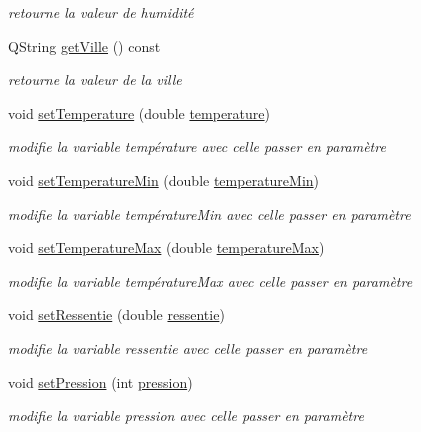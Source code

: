\begin{DoxyCompactItemize}
\begin{DoxyCompactList}\small\item\em retourne la valeur de humidité \end{DoxyCompactList}\item 
Q\+String \hyperlink{class_meteo_af9ceb3e99e123e6931f8cd9cfde57834}{get\+Ville} () const 
\begin{DoxyCompactList}\small\item\em retourne la valeur de la ville \end{DoxyCompactList}\item 
void \hyperlink{class_meteo_a7e15015233ae155d482e414804c4b381}{set\+Temperature} (double \hyperlink{class_meteo_a8086970687d7df655f68775bc0852178}{temperature})
\begin{DoxyCompactList}\small\item\em modifie la variable température avec celle passer en paramètre \end{DoxyCompactList}\item 
void \hyperlink{class_meteo_a7055da66033ec24def1e9f9688b837d1}{set\+Temperature\+Min} (double \hyperlink{class_meteo_a640f1543a82502057c333eed2c2b049e}{temperature\+Min})
\begin{DoxyCompactList}\small\item\em modifie la variable température\+Min avec celle passer en paramètre \end{DoxyCompactList}\item 
void \hyperlink{class_meteo_a1737d7a11c9bf4326071531acfcc3243}{set\+Temperature\+Max} (double \hyperlink{class_meteo_a5dd5312470d767714779344a524fd27b}{temperature\+Max})
\begin{DoxyCompactList}\small\item\em modifie la variable température\+Max avec celle passer en paramètre \end{DoxyCompactList}\item 
void \hyperlink{class_meteo_a73283bb2c6aa7bc205b0490cfb6ddf08}{set\+Ressentie} (double \hyperlink{class_meteo_a405ea827846e04994ed8073f82978995}{ressentie})
\begin{DoxyCompactList}\small\item\em modifie la variable ressentie avec celle passer en paramètre \end{DoxyCompactList}\item 
void \hyperlink{class_meteo_a919f06b3944298a47daf3405bde46402}{set\+Pression} (int \hyperlink{class_meteo_a28fe6c4ed03fcf9829dd5a8997bfb0fc}{pression})
\begin{DoxyCompactList}\small\item\em modifie la variable pression avec celle passer en paramètre \end{DoxyCompactList}\item 

\end{DoxyCompactItemize}
